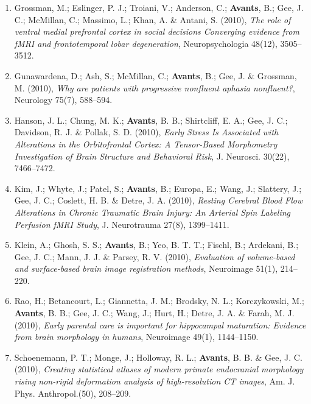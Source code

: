 \documentclass[11pt]{moderncv} %
\begin{document}
\begin{enumerate}
\item  Grossman, M.; Eslinger, P. J.; Troiani, V.; Anderson, C.; \textbf{Avants}, B.; Gee, J. C.; McMillan, C.; Massimo, L.; Khan, A. \&  Antani, S. (2010), \textit{The role of ventral medial prefrontal cortex in social decisions Converging evidence from fMRI and frontotemporal lobar degeneration}, Neuropsychologia 48(12), 3505--3512.

\item  Gunawardena, D.; Ash, S.; McMillan, C.; \textbf{Avants}, B.; Gee, J. \&  Grossman, M. (2010), \textit{Why are patients with progressive nonfluent aphasia nonfluent?}, Neurology 75(7), 588--594.

\item  Hanson, J. L.; Chung, M. K.; \textbf{Avants}, B. B.; Shirtcliff, E. A.; Gee, J. C.; Davidson, R. J. \&  Pollak, S. D. (2010), \textit{Early Stress Is Associated with Alterations in the Orbitofrontal Cortex: A Tensor-Based Morphometry Investigation of Brain Structure and Behavioral Risk}, J. Neurosci. 30(22), 7466--7472.

\item  Kim, J.; Whyte, J.; Patel, S.; \textbf{Avants}, B.; Europa, E.; Wang, J.; Slattery, J.; Gee, J. C.; Coslett, H. B. \&  Detre, J. A. (2010), \textit{Resting Cerebral Blood Flow Alterations in Chronic Traumatic Brain Injury: An Arterial Spin Labeling Perfusion fMRI Study}, J. Neurotrauma 27(8), 1399--1411.

\item  Klein, A.; Ghosh, S. S.; \textbf{Avants}, B.; Yeo, B. T. T.; Fischl, B.; Ardekani, B.; Gee, J. C.; Mann, J. J. \&  Parsey, R. V. (2010), \textit{Evaluation of volume-based and surface-based brain image registration methods}, Neuroimage 51(1), 214--220.

\item  Rao, H.; Betancourt, L.; Giannetta, J. M.; Brodsky, N. L.; Korczykowski, M.; \textbf{Avants}, B. B.; Gee, J. C.; Wang, J.; Hurt, H.; Detre, J. A. \&  Farah, M. J. (2010), \textit{Early parental care is important for hippocampal maturation: Evidence from brain morphology in humans}, Neuroimage 49(1), 1144--1150.

\item  Schoenemann, P. T.; Monge, J.; Holloway, R. L.; \textbf{Avants}, B. B. \&  Gee, J. C. (2010), \textit{Creating statistical atlases of modern primate endocranial morphology rising non-rigid deformation analysis of high-resolution CT images}, Am. J. Phys. Anthropol.(50), 208--209.


\end{enumerate}
\end{document}
